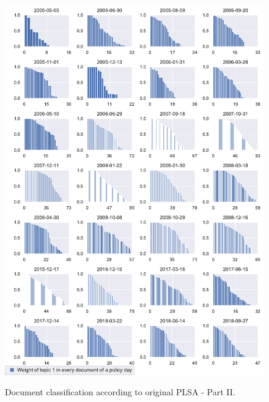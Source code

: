 \documentclass[11pt,a4paper,english,oneside]{book}
\numberwithin{equation}{chapter}
\begin{document}
\begin{figure}
	\caption{Document classification according to original PLSA - Part II.}
	\centering
	\includegraphics[scale=0.8]{Images/docsplit02_orig.pdf}
	\label{classdoc02}
\end{figure}
\end{document}
